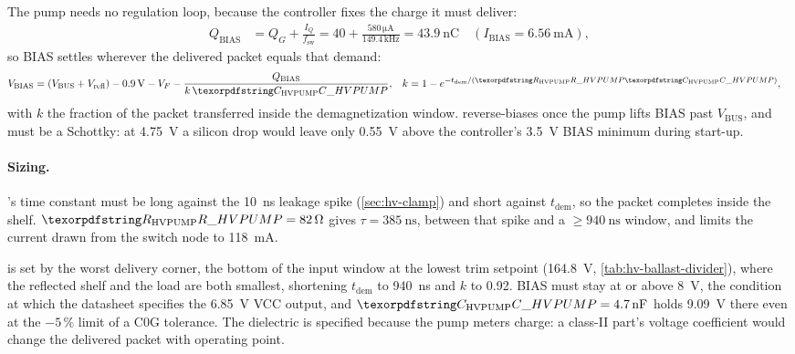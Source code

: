 The pump needs no regulation loop, because the controller fixes the charge it
must deliver:
\begin{align*}
  Q_{\mathrm{BIAS}} &= Q_G + \frac{I_Q}{f_{\mathrm{sw}}}
  = 40 + \frac{580\,\si{\micro\ampere}}{149.4\,\si{\kilo\hertz}}
  = \SI{43.9}{\nano\coulomb}
  \quad (I_{\mathrm{BIAS}} = \SI{6.56}{\milli\ampere}),
\end{align*}
so BIAS settles wherever the delivered packet equals that demand:
\begin{align*}
  V_{\mathrm{BIAS}} &= (V_{\mathrm{BUS}} + V_{\mathrm{refl}})
  - \SI{0.9}{\volt} - V_{F} - \frac{Q_{\mathrm{BIAS}}}{k\,\des{C}{HVPUMP}},
  &
  k &= 1 - e^{-t_{\mathrm{dem}}/(\des{R}{HVPUMP}\des{C}{HVPUMP})},
\end{align*}
with $k$ the fraction of the packet transferred inside the demagnetization
window.  reverse-biases once the pump lifts BIAS past
$V_{\mathrm{BUS}}$, and must be a Schottky: at \SI{4.75}{\volt} a silicon drop
would leave only \SI{0.55}{\volt} above the controller's \SI{3.5}{\volt} BIAS
minimum during start-up.

\paragraph{Sizing.} 's time constant must be long against the
\SI{10}{\nano\second} leakage spike (\cref{sec:hv-clamp}) and short against
$t_{\mathrm{dem}}$, so the packet completes inside the shelf. $\des{R}{HVPUMP} =
\SI{82}{\ohm}$ gives $\tau = \SI{385}{\nano\second}$, between that spike and a
$\ge\SI{940}{\nano\second}$ window, and limits the current drawn from the switch
node to \SI{118}{\milli\ampere}.

 is set by the worst delivery corner, the bottom of the input
window at the lowest trim setpoint (\SI{164.8}{\volt},
\cref{tab:hv-ballast-divider}), where the reflected shelf and the load are both
smallest, shortening $t_{\mathrm{dem}}$ to \SI{940}{\nano\second} and $k$ to
\num{0.92}. BIAS must stay at or above \SI{8}{\volt}, the condition at which the
datasheet specifies the \SI{6.85}{\volt} VCC output, and $\des{C}{HVPUMP} =
\SI{4.7}{\nano\farad}$ holds \SI{9.09}{\volt} there even at the $-5\,\%$ limit
of a C0G tolerance. The dielectric is specified because the pump meters charge:
a class-II part's voltage coefficient would change the delivered packet with
operating point.

